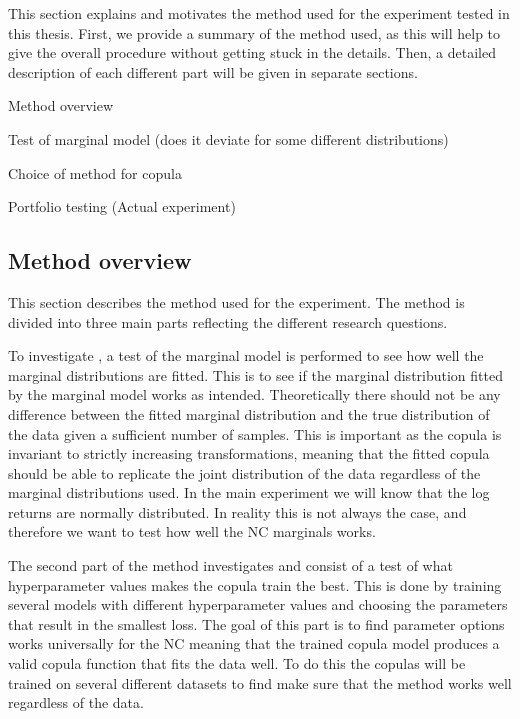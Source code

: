 This section explains and motivates the method used for the experiment tested in this thesis. First, we provide a summary of the method used, as this will help to give the overall procedure without getting stuck in the details. Then, a detailed description of each different part will be given in separate sections. 

\begin{generalinstructions}
    \begin{compactenum}
        \item Method overview
        \item Test of marginal model (does it deviate for some different distributions)
        \item Choice of method for copula
        \item Portfolio testing (Actual experiment)
    \end{compactenum}
\end{generalinstructions}


\subsection{Method overview}
This section describes the method used for the experiment. The method is divided into three main parts reflecting the different research questions. 

To investigate \RQone, a test of the marginal model is performed to see how well the marginal distributions are fitted. This is to see if the marginal distribution fitted by the marginal model works as intended. Theoretically there should not be any difference between the fitted marginal distribution and the true distribution of the data  given a sufficient number of samples. This is important as the copula is invariant to strictly increasing transformations, meaning that the fitted copula should be able to replicate the joint distribution of the data regardless of the marginal distributions used. In the main experiment we will know that the log returns are normally distributed. In reality this is not always the case, and therefore we want to test how well the \gls{NC} marginals works.

The second part of the method investigates \RQtwo  and consist of a test of what hyperparameter values makes the copula train the best. This is done by training several models with different hyperparameter values and choosing the parameters that result in the smallest loss. The goal of this part is to find parameter options works universally for the \gls{NC} meaning that the trained copula model produces a valid copula function that fits the data well. To do this the copulas will be trained on several different datasets to find make sure that the method works well regardless of the data. 

